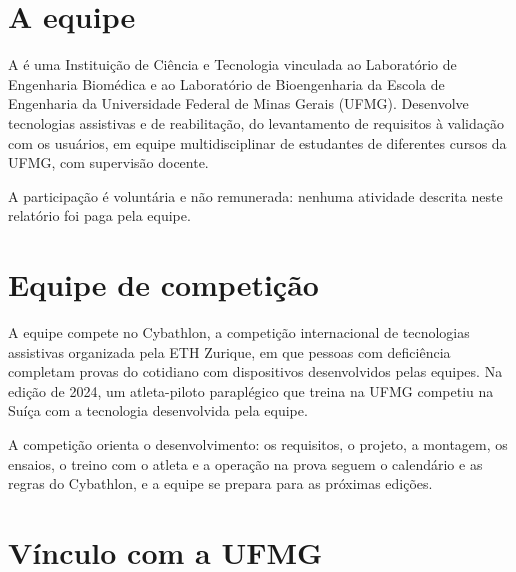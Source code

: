 
\section{A equipe}

A \NRO{} é uma Instituição de Ciência e Tecnologia vinculada ao Laboratório de Engenharia Biomédica e
ao Laboratório de Bioengenharia da Escola de Engenharia da Universidade Federal de Minas Gerais
(UFMG). Desenvolve tecnologias assistivas e de reabilitação, do levantamento de requisitos à
validação com os usuários, em equipe multidisciplinar de estudantes de diferentes cursos da UFMG,
com supervisão docente.

A participação é voluntária e não remunerada: nenhuma atividade descrita neste relatório foi paga
pela equipe.

\section{Equipe de competição}

A equipe compete no Cybathlon, a competição internacional de tecnologias assistivas organizada pela
ETH Zurique, em que pessoas com deficiência completam provas do cotidiano com dispositivos
desenvolvidos pelas equipes. Na edição de 2024, um atleta-piloto paraplégico que treina na UFMG
competiu na Suíça com a tecnologia desenvolvida pela equipe.

A competição orienta o desenvolvimento: os requisitos, o projeto, a montagem, os ensaios, o treino
com o atleta e a operação na prova seguem o calendário e as regras do Cybathlon, e a equipe se
prepara para as próximas edições.

\section{Vínculo com a UFMG}

